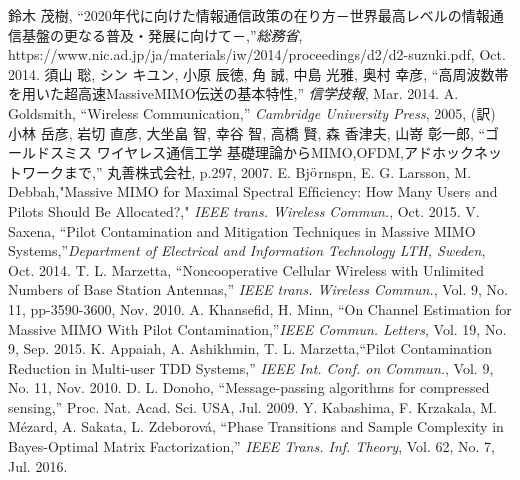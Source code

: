 \documentclass[report]{jsbook}
\begin{document}
\begin{thebibliography}{10}
  鈴木 茂樹, ``2020年代に向けた情報通信政策の在り方－世界最高レベルの情報通信基盤の更なる普及・発展に向けて－,''{\sl 総務省}, \\ {https://www.nic.ad.jp/ja/materials/iw/2014/proceedings/d2/d2-suzuki.pdf}, Oct. 2014.
  須山 聡, シン キユン, 小原 辰徳, 角 誠, 中島 光雅, 奥村 幸彦, ``高周波数帯を用いた超高速MassiveMIMO伝送の基本特性,'' {\sl 信学技報}, Mar. 2014.
  A. Goldsmith, ``Wireless Communication,'' {\sl Cambridge University Press}, 2005, (訳) 小林 岳彦, 岩切 直彦, 大坐畠 智, 幸谷 智, 高橋 賢, 森 香津夫, 山嵜 彰一郎, ``ゴールドスミス ワイヤレス通信工学 基礎理論からMIMO,OFDM,アドホックネットワークまで,'' 丸善株式会社, p.297, 2007.
  E. Bj${\rm \ddot o}$rnspn, E. G. Larsson, M. Debbah,"Massive MIMO for Maximal Spectral Efﬁciency: How Many Users and Pilots Should Be Allocated?," {\sl IEEE trans. Wireless Commun.}, Oct. 2015.
  V. Saxena, ``Pilot Contamination and Mitigation Techniques in Massive MIMO Systems,''{\sl Department of Electrical and Information Technology LTH, Sweden}, Oct. 2014.
  T. L. Marzetta, ``Noncooperative Cellular Wireless with Unlimited Numbers of Base Station Antennas,'' {\sl IEEE trans. Wireless Commun.}, Vol. 9, No. 11, pp-3590-3600, Nov. 2010.
  A. Khansefid, H. Minn, ``On Channel Estimation for Massive MIMO With Pilot Contamination,''{\sl IEEE Commun. Letters}, Vol. 19, No. 9, Sep. 2015.
  K. Appaiah, A. Ashikhmin, T. L. Marzetta,``Pilot Contamination Reduction in Multi-user TDD Systems,'' {\sl IEEE Int. Conf. on Commun.}, Vol. 9, No. 11, Nov. 2010.
  D. L. Donoho, ``Message-passing algorithms for compressed sensing,'' Proc. Nat. Acad. Sci. USA, Jul. 2009. 
  Y. Kabashima, F. Krzakala, M. M\'ezard, A. Sakata, L. Zdeborová, ``Phase Transitions and Sample Complexity in Bayes-Optimal Matrix Factorization,'' {\sl IEEE Trans. Inf. Theory}, Vol. 62, No. 7, Jul. 2016.
\end{thebibliography}
\end{document}

